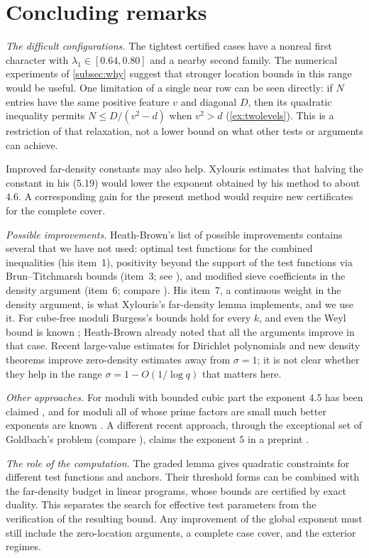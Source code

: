 \section{Concluding remarks}\label{sec:remarks}

\emph{The difficult configurations.} The tightest certified cases have a nonreal first
character with $\lambda_1\in[0.64,0.80]$ and a nearby second family. The numerical
experiments of \cref{subsec:why} suggest that stronger location bounds in this range
would be useful. One limitation of a single near row can be seen directly: if $N$
entries have the same positive feature $v$ and diagonal $D$, then its quadratic
inequality permits $N\le D/(v^2-d)$ when $v^2>d$ (\cref{ex:twolevels}). This is a restriction of that
relaxation, not a lower bound on what other tests or arguments can achieve.

Improved far-density constants may also help. Xylouris estimates
\cite[p.~87]{Xylouris2011nullstellen} that halving the constant in his (5.19) would lower
the exponent obtained by his method to about $4.6$. A corresponding gain for the
present method would require new certificates for the complete cover.

\emph{Possible improvements.} Heath-Brown's list of possible improvements
\cite[\S16]{HeathBrown1992zero} contains several that we have not used: optimal test functions
for the combined inequalities (his item~1), positivity beyond the support of the test functions via
Brun--Titchmarsh bounds (item~3; see \cite{Titchmarsh1930divisor,MontgomeryVaughan1973large,
Iwaniec1982brun,Maynard2013brun}), and modified sieve coefficients in the density argument (item~6;
compare \cite{FriedlanderIwaniec2023selberg}). His item~7, a continuous weight in the density
argument, is what Xylouris's far-density lemma implements, and we use it. For cube-free moduli Burgess's bounds hold for every $k$, and even the
Weyl bound is known \cite{PetrowYoung2020weyl}; Heath-Brown already noted that all the arguments
improve in that case. Recent large-value estimates for Dirichlet polynomials
\cite{GuthMaynard2026new,ChenGuptaLi2025large,TaoTrudgianYang2026new} and new density theorems
\cite{Pintz2019some} improve zero-density estimates away from $\sigma=1$; it is not clear
whether they help in the range $\sigma=1-O(1/\log q)$ that matters here.

\emph{Other approaches.} For moduli with bounded cubic part the exponent $4.5$ has been claimed
\cite{Meng2010note}, and for moduli all of whose prime factors are small much better
exponents are known \cite{Chang2014short}. A different recent approach, through the exceptional set of Goldbach's problem (compare
\cite{Pintz2018new}), claims the exponent $5$ in a preprint \cite{Zhao2025exceptional}.

\emph{The role of the computation.} The graded lemma gives quadratic constraints for
different test functions and anchors. Their threshold forms can be combined with the
far-density budget in linear programs, whose bounds are certified by exact duality.
This separates the search for effective test parameters from the verification of the
resulting bound. Any improvement of the global exponent must still include the
zero-location arguments, a complete case cover, and the exterior regimes.
